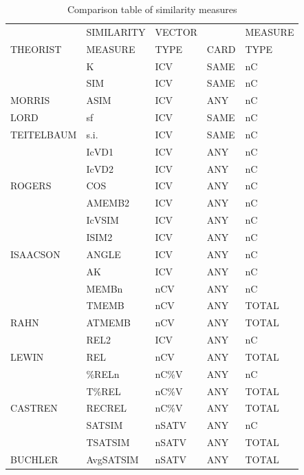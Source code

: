 \documentclass{article}
\begin{document}
\begin{table}[htb]
\caption{Comparison table of similarity measures} 
\begin{center}
\begin{tabular}{lllll}
\hline
             &  SIMILARITY  &  VECTOR  &        &  MEASURE  \\
 THEORIST    &  MEASURE     &  TYPE    &  CARD  &  TYPE     \\
\hline
             &  K           &  ICV     &  SAME  &  nC       \\
             &  SIM         &  ICV     &  SAME  &  nC       \\
 MORRIS      &  ASIM        &  ICV     &  ANY   &  nC       \\
\hline
 LORD        &  sf          &  ICV     &  SAME  &  nC       \\
\hline
 TEITELBAUM  &  s.i.        &  ICV     &  SAME  &  nC       \\
\hline
             &  IcVD1       &  ICV     &  ANY   &  nC       \\
             &  IcVD2       &  ICV     &  ANY   &  nC       \\
 ROGERS      &  COS         &  ICV     &  ANY   &  nC       \\
\hline
             &  AMEMB2      &  ICV     &  ANY   &  nC       \\
             &  IcVSIM      &  ICV     &  ANY   &  nC       \\
             &  ISIM2       &  ICV     &  ANY   &  nC       \\
 ISAACSON    &  ANGLE       &  ICV     &  ANY   &  nC       \\
\hline
             &  AK          &  ICV     &  ANY   &  nC       \\
             &  MEMBn       &  nCV     &  ANY   &  nC       \\
             &  TMEMB       &  nCV     &  ANY   &  TOTAL    \\
 RAHN        &  ATMEMB      &  nCV     &  ANY   &  TOTAL    \\
\hline
             &  REL2        &  ICV     &  ANY   &  nC       \\
 LEWIN       &  REL         &  nCV     &  ANY   &  TOTAL    \\
\hline
             &  \%RELn      &  nC\%V   &  ANY   &  nC       \\
             &  T\%REL      &  nC\%V   &  ANY   &  TOTAL    \\
 CASTREN     &  RECREL      &  nC\%V   &  ANY   &  TOTAL    \\
\hline
             &  SATSIM      &  nSATV   &  ANY   &  nC       \\
             &  TSATSIM     &  nSATV   &  ANY   &  TOTAL    \\
 BUCHLER     &  AvgSATSIM   &  nSATV   &  ANY   &  TOTAL    \\
\hline
\end{tabular}
\end{center}
\end{table}
\end{document}
